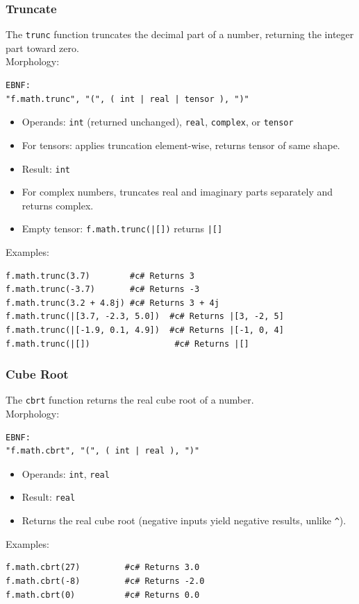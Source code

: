 \subsubsection{Truncate}
The \texttt{trunc} function truncates the decimal part of a number, returning the integer part toward zero.\\
Morphology:
\begin{verbatim}
EBNF:
"f.math.trunc", "(", ( int | real | tensor ), ")"
\end{verbatim}
\begin{itemize}
\item Operands: \texttt{int} (returned unchanged), \texttt{real}, \texttt{complex}, or \texttt{tensor}
\item For tensors: applies truncation element-wise, returns tensor of same shape.
\item Result: \texttt{int}
\item For complex numbers, truncates real and imaginary parts separately and returns complex.
\item Empty tensor: \texttt{f.math.trunc(|[])} returns \texttt{|[]}
\end{itemize}
Examples:
\begin{verbatim}
f.math.trunc(3.7)        #c# Returns 3
f.math.trunc(-3.7)       #c# Returns -3
f.math.trunc(3.2 + 4.8j) #c# Returns 3 + 4j
f.math.trunc(|[3.7, -2.3, 5.0])  #c# Returns |[3, -2, 5]
f.math.trunc(|[-1.9, 0.1, 4.9])  #c# Returns |[-1, 0, 4]
f.math.trunc(|[])                 #c# Returns |[]
\end{verbatim}

\subsubsection{Cube Root}
The \texttt{cbrt} function returns the real cube root of a number.\\
Morphology:
\begin{verbatim}
EBNF:
"f.math.cbrt", "(", ( int | real ), ")"
\end{verbatim}
\begin{itemize}
\item Operands: \texttt{int}, \texttt{real}
\item Result: \texttt{real}
\item Returns the real cube root (negative inputs yield negative results, unlike \texttt{\^{}}).
\end{itemize}
Examples:
\begin{verbatim}
f.math.cbrt(27)         #c# Returns 3.0
f.math.cbrt(-8)         #c# Returns -2.0
f.math.cbrt(0)          #c# Returns 0.0
\end{verbatim}

